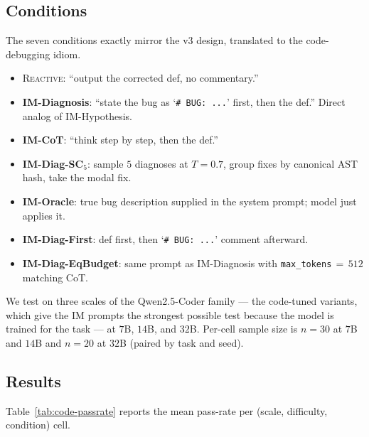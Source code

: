 \documentclass[11pt]{article}
\newcommand{\reactive}{\textsc{Reactive}}
\begin{document}
\subsection{Conditions}

The seven conditions exactly mirror the v3 design, translated to
the code-debugging idiom.

\begin{itemize}[leftmargin=2em,itemsep=0pt,topsep=2pt]
\item \reactive: ``output the corrected def, no commentary.''
\item \textbf{IM-Diagnosis}: ``state the bug as
  `\texttt{\# BUG: ...}' first, then the def.''  Direct analog of
  IM-Hypothesis.
\item \textbf{IM-CoT}: ``think step by step, then the def.''
\item \textbf{IM-Diag-SC$_5$}: sample $5$ diagnoses at $T = 0.7$,
  group fixes by canonical AST hash, take the modal fix.
\item \textbf{IM-Oracle}: true bug description supplied in the
  system prompt; model just applies it.
\item \textbf{IM-Diag-First}: def first, then
  `\texttt{\# BUG: ...}' comment afterward.
\item \textbf{IM-Diag-EqBudget}: same prompt as IM-Diagnosis with
  \texttt{max\_tokens}\,$=$\,$512$ matching CoT.
\end{itemize}

We test on three scales of the Qwen2.5-Coder family --- the
code-tuned variants, which give the IM prompts the strongest
possible test because the model is trained for the task ---
at $7$B, $14$B, and $32$B.  Per-cell sample size is $n = 30$ at
$7$B and $14$B and $n = 20$ at $32$B (paired by task and seed).

\subsection{Results}

Table~\ref{tab:code-passrate} reports the mean pass-rate per
(scale, difficulty, condition) cell.
\end{document}
